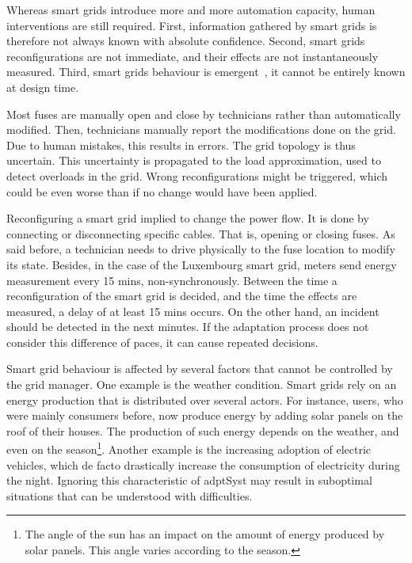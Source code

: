 \bigskip

Whereas smart grids introduce more and more automation capacity, human interventions are still required.
First, information gathered by smart grids is therefore not always known with absolute confidence.
Second, smart grids reconfigurations are not immediate, and their effects are not instantaneously measured.
Third, smart grids behaviour is emergent~\cite{zio2011uncertainties}, \ie it cannot be entirely known at design time.

Most fuses are manually open and close by technicians rather than automatically modified.
Then, technicians manually report the modifications done on the grid.
Due to human mistakes, this results in errors.
The grid topology is thus uncertain.
This uncertainty is propagated to the load approximation, used to detect overloads in the grid.
Wrong reconfigurations might be triggered, which could be even worse than if no change would have been applied.

Reconfiguring a smart grid implied to change the power flow.
It is done by connecting or disconnecting specific cables.
That is, opening or closing fuses.
As said before, a technician needs to drive physically to the fuse location to modify its state.
Besides, in the case of the Luxembourg smart grid, meters send energy measurement every 15 mins, non-synchronously.
Between the time a reconfiguration of the smart grid is decided, and the time the effects are measured, a delay of at least 15 mins occurs.
On the other hand, an incident should be detected in the next minutes.
If the adaptation process does not consider this difference of paces, it can cause repeated decisions.

Smart grid behaviour is affected by several factors that cannot be controlled by the grid manager.
One example is the weather condition.
Smart grids rely on an energy production that is distributed over several actors.
For instance, users, who were mainly consumers before, now produce energy by adding solar panels on the roof of their houses.
The production of such energy depends on the weather, and even on the season\footnote{The angle of the sun has an impact on the amount of energy produced by solar panels. This angle varies according to the season.}.
Another example is the increasing adoption of electric vehicles, which de facto drastically increase the consumption of electricity during the night.
Ignoring this characteristic of \gls{adptSyst} may result in suboptimal situations that can be understood with difficulties.